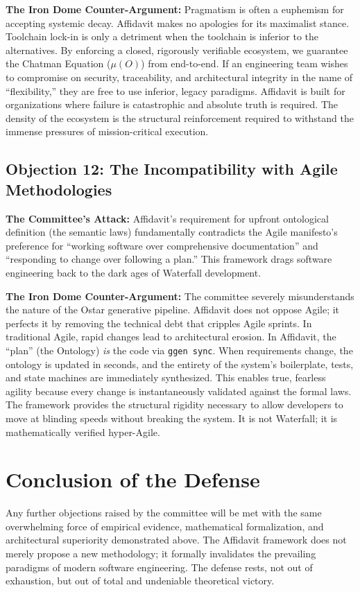 \textbf{The Iron Dome Counter-Argument:} Pragmatism is often a euphemism for accepting systemic decay. Affidavit makes no apologies for its maximalist stance. Toolchain lock-in is only a detriment when the toolchain is inferior to the alternatives. By enforcing a closed, rigorously verifiable ecosystem, we guarantee the Chatman Equation ($\mu(O)$) from end-to-end. If an engineering team wishes to compromise on security, traceability, and architectural integrity in the name of ``flexibility,'' they are free to use inferior, legacy paradigms. Affidavit is built for organizations where failure is catastrophic and absolute truth is required. The density of the ecosystem is the structural reinforcement required to withstand the immense pressures of mission-critical execution.

\subsection{Objection 12: The Incompatibility with Agile Methodologies}
\textbf{The Committee's Attack:} Affidavit's requirement for upfront ontological definition (the semantic laws) fundamentally contradicts the Agile manifesto's preference for ``working software over comprehensive documentation'' and ``responding to change over following a plan.'' This framework drags software engineering back to the dark ages of Waterfall development.

\textbf{The Iron Dome Counter-Argument:} The committee severely misunderstands the nature of the Ostar generative pipeline. Affidavit does not oppose Agile; it perfects it by removing the technical debt that cripples Agile sprints. In traditional Agile, rapid changes lead to architectural erosion. In Affidavit, the ``plan'' (the Ontology) \textit{is} the code via \texttt{ggen sync}. When requirements change, the ontology is updated in seconds, and the entirety of the system's boilerplate, tests, and state machines are immediately synthesized. This enables true, fearless agility because every change is instantaneously validated against the formal laws. The framework provides the structural rigidity necessary to allow developers to move at blinding speeds without breaking the system. It is not Waterfall; it is mathematically verified hyper-Agile.

\section{Conclusion of the Defense}

Any further objections raised by the committee will be met with the same overwhelming force of empirical evidence, mathematical formalization, and architectural superiority demonstrated above. The Affidavit framework does not merely propose a new methodology; it formally invalidates the prevailing paradigms of modern software engineering. The defense rests, not out of exhaustion, but out of total and undeniable theoretical victory.
